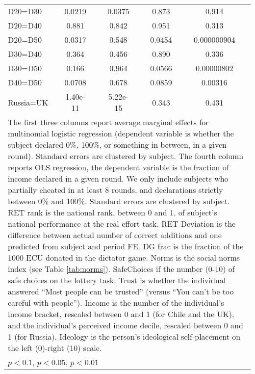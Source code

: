 \begin{tabular}{l|cccccc|cc}
D20=D30         &   0.0219         &         &   0.0375         &         &    0.873         &         &    0.914         &         \\
D20=D40         &    0.881         &         &    0.842         &         &    0.951         &         &    0.313         &         \\
D20=D50         &   0.0317         &         &    0.548         &         &   0.0454         &         &0.000000904         &         \\
D30=D40         &    0.364         &         &    0.456         &         &    0.890         &         &    0.336         &         \\
D30=D50         &    0.166         &         &    0.964         &         &   0.0566         &         &0.00000802         &         \\
D40=D50         &   0.0708         &         &    0.678         &         &   0.0859         &         &  0.00316         &         \\
Russia=UK       & 1.40e-11         &         & 5.22e-15         &         &    0.343         &         &    0.431         &         \\
\hline\hline
\multicolumn{9}{p{16cm}}{\tiny The first three columns report average marginal effects for multinomial logistic regression (dependent variable is whether the subject declared 0\%, 100\%, or something in between, in a given round). Standard errors are clustered by subject. The fourth column reports OLS regression, the dependent variable is the fraction of income declared in a given round. We only include subjects who partially cheated in at least 8 rounds, and declarations strictly between 0\% and 100\%. Standard errors are clustered by subject. RET rank is the national rank, between 0 and 1, of subject's national performance at the real effort task. RET Deviation is the difference between actual number of correct additions and one predicted from subject and period FE. DG frac is the fraction of the 1000 ECU donated in the dictator game. Norms is the social norms index (see Table \ref{tab:norms}). SafeChoices if the number (0-10) of safe choices on the lottery task. Trust is whether the individual answered ``Most people can be trusted'' (versus ``You can't be too careful with people''). Income is the number of the individual's income bracket, rescaled between 0 and 1 (for Chile and the UK), and the individual's perceived income decile, rescaled between 0 and 1 (for Russia). Ideology is the person's ideological self-placement on the left (0)-right (10) scale.}\\
\multicolumn{9}{l}{\tiny \sym{*} \(p<0.1\), \sym{**} \(p<0.05\), \sym{***} \(p<0.01\)}\\
\end{tabular}